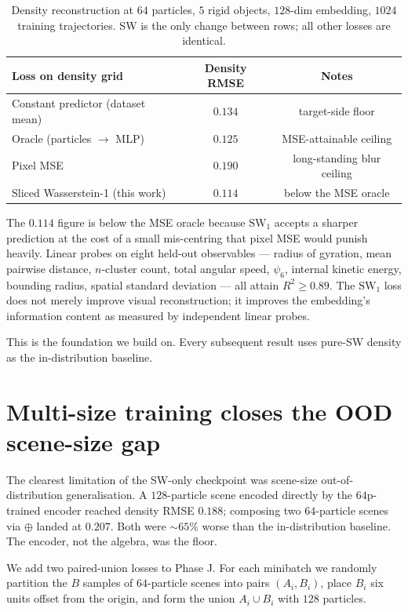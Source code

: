 \documentclass[11pt]{article}
\newcommand{\combine}{\oplus}
\newcommand{\SW}{\mathrm{SW}}
\begin{document}
\begin{table}[t]
\centering
\caption{Density reconstruction at $64$ particles, $5$ rigid objects, $128$-dim embedding, $1024$ training trajectories. SW is the only change between rows; all other losses are identical.}
\label{tab:sw}
\begin{tabular}{lcc}
\toprule
Loss on density grid & Density RMSE & Notes \\
\midrule
Constant predictor (dataset mean) & $0.134$ & target-side floor \\
Oracle (particles $\to$ MLP) & $0.125$ & MSE-attainable ceiling \\
\midrule
Pixel MSE & $0.190$ & long-standing blur ceiling \\
Sliced Wasserstein-1 (this work) & $\mathbf{0.114}$ & below the MSE oracle \\
\bottomrule
\end{tabular}
\end{table}

The $0.114$ figure is below the MSE oracle because $\SW_1$ accepts a sharper prediction at the cost of a small mis-centring that pixel MSE would punish heavily. Linear probes on eight held-out observables --- radius of gyration, mean pairwise distance, $n$-cluster count, total angular speed, $\psi_6$, internal kinetic energy, bounding radius, spatial standard deviation --- all attain $R^2 \ge 0.89$. The $\SW_1$ loss does not merely improve visual reconstruction; it improves the embedding's information content as measured by independent linear probes.

This is the foundation we build on. Every subsequent result uses pure-SW density as the in-distribution baseline.

\section{Multi-size training closes the OOD scene-size gap}
\label{sec:multisize}

The clearest limitation of the SW-only checkpoint was scene-size out-of-distribution generalisation. A $128$-particle scene encoded directly by the $64$p-trained encoder reached density RMSE $0.188$; composing two $64$-particle scenes via $\combine$ landed at $0.207$. Both were $\sim 65\%$ worse than the in-distribution baseline. The encoder, not the algebra, was the floor.

We add two paired-union losses to Phase J. For each minibatch we randomly partition the $B$ samples of $64$-particle scenes into pairs $(A_i, B_i)$, place $B_i$ six units offset from the origin, and form the union $A_i \cup B_i$ with $128$ particles.
\end{document}
